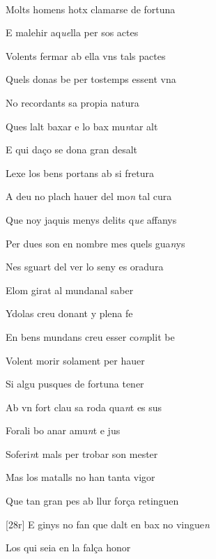 \documentclass[12pt]{article}
\renewcommand{\espaiAbansEtiquetaPoema}{\vspace{0ex}}
\begin{document}
\begin{estrofa}

\espaiAbansEtiquetaPoema

\\

\end{estrofa}


\begin{estrofa}

 Molts homens hotx clamarse de fortuna

 E malehir aq\textit{ue}lla per sos actes

 Volents fermar ab ella vns tals pactes

 Quels donas be per tostemps essent vna

 No recordants sa propia natura

 Ques lalt baxar e lo bax mu\textit{n}tar alt

 E qui da\c{c}o se dona gran desalt

 Lexe los bens portans ab si fretura

\end{estrofa}



\begin{estrofa}

 A deu no plach hauer del mo\textit{n} tal cura

 Que noy jaquis menys delits q\textit{ue} affanys

 Per dues son en nombre mes quels gua\textit{n}ys

 Nes sguart del ver lo seny es oradura

 Elom girat al mundanal saber

 Ydolas creu donant y plena fe

 En bens mundans creu esser co\textit{m}plit be

 Volent morir solament per hauer

\end{estrofa}



\begin{estrofa}

 Si algu pusques de fortuna tener

 Ab vn fort clau sa roda qua\textit{n}t es sus

 Forali bo anar amu\textit{n}t e jus

 Soferi\textit{n}t mals per trobar son mester

 Mas los matalls no han tanta vigor

 Que tan gran pes ab llur for\c{c}a retinguen

 [28r] E ginys no fan que dalt en bax no vingue\textit{n}

 Los qui seia en la fal\c{c}a honor

\end{estrofa}
\end{document}
